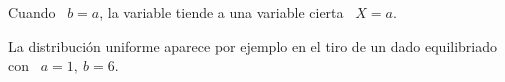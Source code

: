 Cuando \ $b = a$, la variable tiende a una variable cierta \ $X = a$.

La  distribuci\'on  uniforme  aparece  por   ejemplo  en  el  tiro  de  un  dado
equilibriado con \ $a = 1, \: b = 6$.
